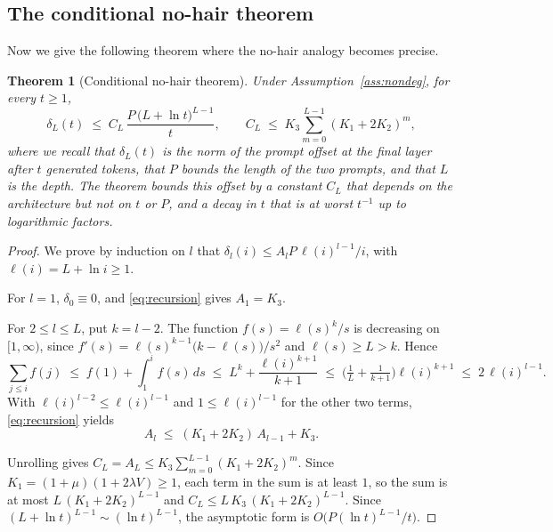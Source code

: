 \documentclass[11pt]{article}
\newtheorem{theorem}{Theorem}
\theoremstyle{definition}
\theoremstyle{remark}
\begin{document}
\subsection{The conditional no-hair theorem}
\label{sec:theory-main}
Now we give the following theorem where the no-hair analogy becomes precise.
\begin{theorem}[Conditional no-hair theorem]\label{thm:nohair}
Under Assumption~\ref{ass:nondeg}, for every $t\ge1$,
\begin{equation}\label{eq:nohair}
  \delta_L(t)\;\le\;C_L\,\frac{P\,\big(L+\ln t\big)^{L-1}}{t},
  \qquad C_L\;\le\;K_3\sum_{m=0}^{L-1}(K_1+2K_2)^{m}, 
\end{equation}
where we recall that $\delta_L(t)$ is the norm of the prompt offset at the final layer after $t$ generated tokens, that $P$ bounds the length of the two prompts, and that $L$ is the depth. The theorem bounds this offset by a constant $C_L$ that depends on the architecture but not on $t$ or $P$, and a decay in $t$ that is at worst $t^{-1}$ up to logarithmic factors.
\end{theorem}
\begin{proof}
We prove by induction on $l$ that $\delta_l(i)\le A_lP\,\ell(i)^{l-1}/i$, with $\ell(i)=L+\ln i\ge1$.

For $l=1$, $\delta_0\equiv0$, and \eqref{eq:recursion} gives $A_1=K_3$.

For $2\le l\le L$, put $k=l-2$. The function $f(s)=\ell(s)^k/s$ is decreasing on $[1,\infty)$, since $f'(s)=\ell(s)^{k-1}\big(k-\ell(s)\big)/s^2$ and $\ell(s)\ge L>k$. Hence
\[
\sum_{j\le i}f(j)\;\le\;f(1)+\int_1^if(s)\,ds\;\le\;L^{k}+\frac{\ell(i)^{k+1}}{k+1}\;\le\;\Big(\tfrac1L+\tfrac1{k+1}\Big)\ell(i)^{k+1}\;\le\;2\,\ell(i)^{l-1}.
\]
With $\ell(i)^{l-2}\le\ell(i)^{l-1}$ and $1\le\ell(i)^{l-1}$ for the other two terms, \eqref{eq:recursion} yields
\[
A_l\;\le\;(K_1+2K_2)\,A_{l-1}+K_3.
\]

Unrolling gives $C_L=A_L\le K_3\sum_{m=0}^{L-1}(K_1+2K_2)^m$. Since $K_1=(1+\mu)(1+2\lambda V)\ge1$, each term in the sum is at least $1$, so the sum is at most $L\,(K_1+2K_2)^{L-1}$ and $C_L\le L\,K_3\,(K_1+2K_2)^{L-1}$. Since $(L+\ln t)^{L-1}\sim(\ln t)^{L-1}$, the asymptotic form is $O\big(P(\ln t)^{L-1}/t\big)$.
\end{proof}
\end{document}
